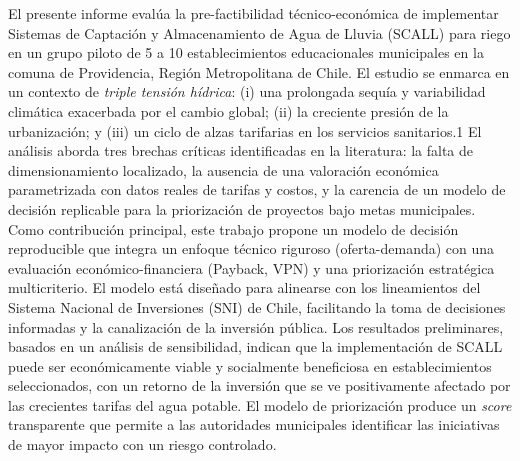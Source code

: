 El presente informe evalúa la pre-factibilidad técnico-económica de implementar Sistemas de Captación y Almacenamiento de Agua de Lluvia (SCALL) para riego en un grupo piloto de 5 a 10 establecimientos educacionales municipales en la comuna de Providencia, Región Metropolitana de Chile. El estudio se enmarca en un contexto de \textit{triple tensión hídrica}: (i) una prolongada sequía y variabilidad climática exacerbada por el cambio global; (ii) la creciente presión de la urbanización; y (iii) un ciclo de alzas tarifarias en los servicios sanitarios.1
El análisis aborda tres brechas críticas identificadas en la literatura: la falta de dimensionamiento localizado, la ausencia de una valoración económica parametrizada con datos reales de tarifas y costos, y la carencia de un modelo de decisión replicable para la priorización de proyectos bajo metas municipales. Como contribución principal, este trabajo propone un modelo de decisión reproducible que integra un enfoque técnico riguroso (oferta-demanda) con una evaluación económico-financiera (Payback, VPN) y una priorización estratégica multicriterio. El modelo está diseñado para alinearse con los lineamientos del Sistema Nacional de Inversiones (SNI) de Chile, facilitando la toma de decisiones informadas y la canalización de la inversión pública.
Los resultados preliminares, basados en un análisis de sensibilidad, indican que la implementación de SCALL puede ser económicamente viable y socialmente beneficiosa en establecimientos seleccionados, con un retorno de la inversión que se ve positivamente afectado por las crecientes tarifas del agua potable. El modelo de priorización produce un \textit{score} transparente que permite a las autoridades municipales identificar las iniciativas de mayor impacto con un riesgo controlado.

